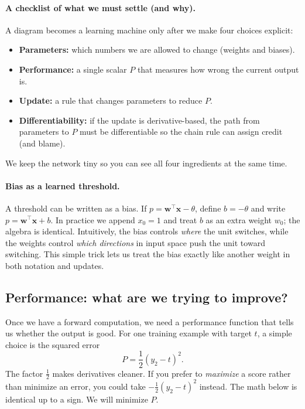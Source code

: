 \paragraph{A checklist of what we must settle (and why).}
A diagram becomes a learning machine only after we make four choices explicit:
\begin{itemize}
    \item \textbf{Parameters:} which numbers we are allowed to change (weights and biases).
    \item \textbf{Performance:} a single scalar \(P\) that measures how wrong the current output is.
    \item \textbf{Update:} a rule that changes parameters to reduce \(P\).
    \item \textbf{Differentiability:} if the update is derivative-based, the path from parameters to \(P\) must be differentiable so the chain rule can assign credit (and blame).
\end{itemize}
We keep the network tiny so you can see all four ingredients at the same time.

\paragraph{Bias as a learned threshold.}
A threshold can be written as a bias. If \(p=\mathbf{w}^\top\mathbf{x}-\theta\), define \(b=-\theta\) and write \(p=\mathbf{w}^\top\mathbf{x}+b\). In practice we append \(x_0=1\) and treat \(b\) as an extra weight \(w_0\); the algebra is identical. Intuitively, the bias controls \emph{where} the unit switches, while the weights control \emph{which directions} in input space push the unit toward switching. This simple trick lets us treat the bias exactly like another weight in both notation and updates.

\subsection{Performance: what are we trying to improve?}
\label{sec:mlp_performance_what_are_we_trying_to_improve}

Once we have a forward computation, we need a performance function that tells us whether the output is good. For one training example with target $t$, a simple choice is the squared error
\begin{equation}
 P = \frac{1}{2}(y_2 - t)^2.
 \label{eq:performance}
\end{equation}
The factor $\tfrac{1}{2}$ makes derivatives cleaner. If you prefer to \emph{maximize} a score rather than minimize an error, you could take $-\tfrac{1}{2}(y_2-t)^2$ instead. The math below is identical up to a sign. We will minimize $P$.


